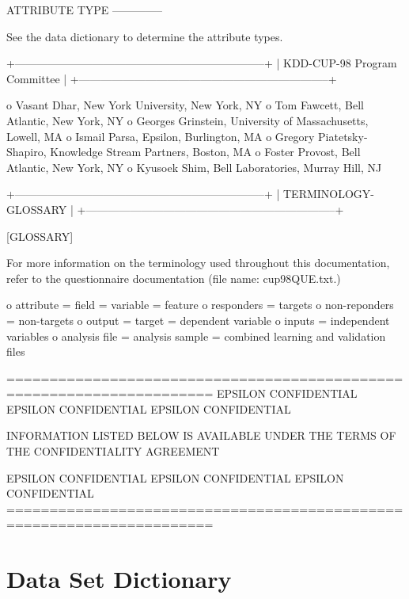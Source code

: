 \documentclass[
  11pt,
  a4paper,
  DIV=12,captions=tableheading,oneside,titlepage]{scrbook}
\let\oldverbatim\verbatim
\let\endoldverbatim\endverbatim
\renewenvironment{verbatim}{\footnotesize\oldverbatim}{\endoldverbatim}
\begin{document}
\begin{verbatim}
ATTRIBUTE TYPE
--------------

See the data dictionary to determine the attribute types. 


+--------------------------------------------------------------------+
| KDD-CUP-98 Program Committee                                       |
+--------------------------------------------------------------------+

o Vasant Dhar, New York University, New York, NY
o Tom Fawcett, Bell Atlantic, New York, NY
o Georges Grinstein, University of Massachusetts, Lowell, MA
o Ismail Parsa, Epsilon, Burlington, MA
o Gregory Piatetsky-Shapiro, Knowledge Stream Partners, Boston, MA
o Foster Provost, Bell Atlantic, New York, NY
o Kyusoek Shim, Bell Laboratories, Murray Hill, NJ


+--------------------------------------------------------------------+
| TERMINOLOGY-GLOSSARY                                               |
+--------------------------------------------------------------------+

[GLOSSARY]

For more information on the terminology used throughout this
documentation, refer to the questionnaire documentation (file name:
cup98QUE.txt.)

o attribute = field = variable = feature
o responders = targets
o non-reponders = non-targets 
o output = target = dependent variable
o inputs = independent variables
o analysis file = analysis sample = combined learning and validation 
  files 

======================================================================
EPSILON CONFIDENTIAL      EPSILON CONFIDENTIAL    EPSILON CONFIDENTIAL

    INFORMATION LISTED BELOW IS AVAILABLE UNDER THE TERMS OF THE  
                      CONFIDENTIALITY AGREEMENT                

EPSILON CONFIDENTIAL      EPSILON CONFIDENTIAL    EPSILON CONFIDENTIAL
======================================================================

\end{verbatim}

\hypertarget{data-set-dictionary}{%
\section{Data Set Dictionary}\label{data-set-dictionary}}
\end{document}
